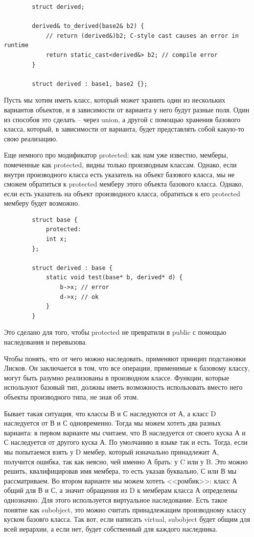 \documentclass[12pt, a4paper]{article}
\begin{document}
	\begin{verbatim}
		struct derived;
		
		derived& to_derived(base2& b2) {
			// return (derived&)b2; C-style cast causes an error in runtime
			return static_cast<derived&> b2; // compile error
		}
		
		struct derived : base1, base2 {};
	\end{verbatim}
	\par Пусть мы хотим иметь класс, который может хранить один из нескольких вариантов объектов, и в зависимости от варианта у него будут разные поля. Один из способов это сделать -- через union, а другой с помощью хранения базового класса, который, в зависимости от варианта, будет представлять собой какую-то свою реализацию.
	\\\par Еще немного про модификатор protected: как нам уже известно, мемберы, помеченные как protected, видны только производным классам. Однако, если внутри производного класса есть указатель на объект базового класса, мы не сможем обратиться к protected мемберу этого объекта базового класса. Однако, если есть указатель на объект производного класса, обратиться к его protected мемберу будет возможно.
	\begin{verbatim}
		struct base {
			protected:
			int x;
		};
		
		struct derived : base {
			static void test(base* b, derived* d) {
				b->x; // error
				d->x; // ok
			}
		}
	\end{verbatim}
	Это сделано для того, чтобы protected не превратили в public с помощью наследования и перевызова.\\
	\par Чтобы понять, что от чего можно наследовать, применяют принцип подстановки Лисков. Он заключается в том, что все операции, применимые к базовому классу, могут быть разумно реализованы в производном классе. Функции, которые используют базовый тип, должны иметь возможность использовать вместо него объекты производного типа, не зная об этом.
	\par Бывает такая ситуация, что классы В и С наследуются от А, а класс D наследуется от В и С одновременно. Тогда мы можем хотеть два разных варианта: в первом варианте мы считаем, что В наследуется от своего куска А и С наследуется от другого куска А. По умолчанию в языке так и есть. Тогда, если мы попытаемся взять у D мембер, который изначально принадлежит А, получится ошибка, так как неясно, чей именно А брать: у C или у B. Это можно решить, квалифицировав имя мембера, то есть указав буквально, С или В мы рассматриваем. Во втором варианте мы можем хотеть <<ромбик>>: класс А общий для В и С, а значит обращения из D к мемберам класса А определены однозначно. Для этого используется виртуальное наследование. Есть такое понятие как subobject, это можно считать принадлежащим производному классу куском базовго класса. Так вот, если написать virtual, subobject будет общим для всей иерархии, а если нет, будет собственный для каждого наследника.
\end{document}

